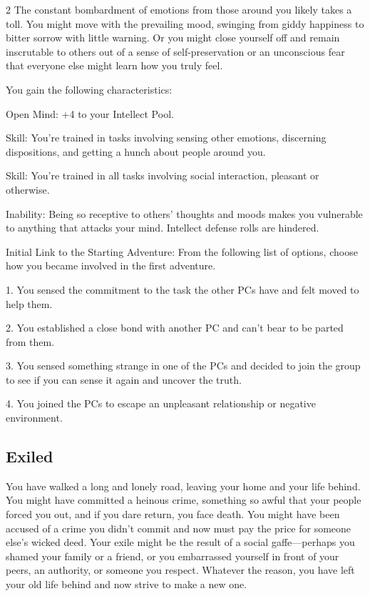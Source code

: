 \begin{multicols}{2}
The constant bombardment of emotions from those around you likely takes a toll. You might move with the prevailing mood, swinging from giddy happiness to bitter sorrow with little warning. Or you might close yourself off and remain inscrutable to others out of a sense of self-preservation or an unconscious fear that everyone else might learn how you truly feel. 

You gain the following characteristics:

Open Mind: +4 to your Intellect Pool.

Skill: You’re trained in tasks involving sensing other emotions, discerning dispositions, and getting a hunch about people around you.

Skill: You’re trained in all tasks involving social interaction, pleasant or otherwise.

Inability: Being so receptive to others’ thoughts and moods makes you vulnerable to anything that attacks your mind. Intellect defense rolls are hindered.

Initial Link to the Starting Adventure: From the following list of options, choose how you became involved in the first adventure.

1. You sensed the commitment to the task the other PCs have and felt moved to help them.

2. You established a close bond with another PC and can’t bear to be parted from them.

3. You sensed something strange in one of the PCs and decided to join the group to see if you can sense it again and uncover the truth.

4. You joined the PCs to escape an unpleasant relationship or negative environment.

\subsection{Exiled}

You have walked a long and lonely road, leaving your home and your life behind. You might have committed a heinous crime, something so awful that your people forced you out, and if you dare return, you face death. You might have been accused of a crime you didn’t commit and now must pay the price for someone else’s wicked deed. Your exile might be the result of a social gaffe—perhaps you shamed your family or a friend, or you embarrassed yourself in front of your peers, an authority, or someone you respect. Whatever the reason, you have left your old life behind and now strive to make a new one.


\end{multicols}
